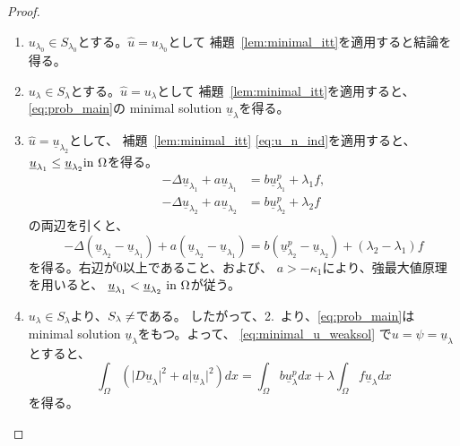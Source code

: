 \begin{proof}
 \begin{enumerate}
  \item $u_{\lambda_0} \in S_{\lambda_0}$とする。$\hat{u} =
        u_{\lambda_0}$として
        補題~\ref{lem:minimal_itt}を適用すると結論を得る。
  \item $u_{\lambda} \in S_{\lambda}$とする。$\hat{u} =
        u_{\lambda}$として
        補題~\ref{lem:minimal_itt}を適用すると、\ref{eq:prob_main}の
        minimal solution $\underline{u}_\lambda$を得る。
  \item $\hat{u} = \underline{u}_{\lambda_2}$として、
        補題~\ref{lem:minimal_itt}
        \eqref{eq:u_n_ind}を適用すると、$\underline{u}_{\lambda_1} \leq
        \underline{u}_{\lambda_2} \text{in}~ \Omega$を得る。
        \begin{align*}
         -\Delta \underline{u}_{\lambda_1} + a
         \underline{u}_{\lambda_1} 
         &= b \underline{u}_{\lambda_1}^p + \lambda_1 f, \\
         -\Delta \underline{u}_{\lambda_2} + a
         \underline{u}_{\lambda_2} 
         &= b \underline{u}_{\lambda_2}^p + \lambda_2 f
        \end{align*}
        の両辺を引くと、
        \[
         -\Delta (\underline{u}_{\lambda_2} - \underline{u}_{\lambda_1}) + a
         (\underline{u}_{\lambda_2} - \underline{u}_{\lambda_1} )
         = b (\underline{u}_{\lambda_2}^p -
        \underline{u}_{\lambda_2}) + (\lambda_2 - \lambda_1) f
        \]
        を得る。右辺が$0$以上であること、および、
        $a > -\kappa_1$により、強最大値原理を用いると、
        $\underline{u}_{\lambda_1} <
        \underline{u}_{\lambda_2} ~\text{in}~ \Omega$が従う。
  \item $u_\lambda \in S_\lambda$より、$S_\lambda \neq \empty$である。
        したがって、2.~より、\ref{eq:prob_main}は minimal solution
        $\underline{u}_\lambda$をもつ。よって、
        \eqref{eq:minimal_u_weaksol}
        で$u = \psi = \underline{u}_\lambda$とすると、
        \begin{equation}
         \int_\Omega \left( \lvert D\underline{u}_\lambda \rvert^2 + a
                      \lvert \underline{u}_\lambda \rvert^2 \right) dx 
          = \int_\Omega b\underline{u}_\lambda^p dx 
          + \lambda \int_\Omega f \underline{u}_\lambda dx
          \label{eq:minimal_inp_same_weak}
        \end{equation}
        を得る。
        

\end{enumerate}
\end{proof}
